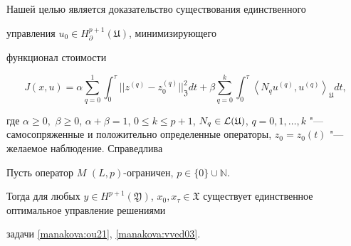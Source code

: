 \smallskip



Нашей целью является доказательство существования единственного %

управления  $u_0 \in{H}^{p+1}_\partial (\mathfrak U)$, минимизирующего

функционал стоимости

\begin{equation}\label{manakova:ou23}

J(x, u) = \alpha\sum^{1}_{q=0} \int^{\tau}_{0}||z^{(q)} - z_0^{(q)}||^2_\mathfrak Z dt +

\beta\sum^{k}_{q=0} \int^{\tau}_{0}\left\langle N_q u^{(q)},

u^{(q)}\right\rangle_\mathfrak U dt,

\end{equation}

где $\alpha\geq 0,$ $\beta\geq0$, $\alpha+\beta=1$, $0\leq k \leq p+1$, $N_q\in {\cal L} (\mathfrak U)$, $q=0, 1, \ldots, k$ "--- самосопряженные и положительно определенные операторы, $z_0=z_0 (t)$ "--- желаемое наблюдение. Справедлива



\begin{theorem}

Пусть оператор $M$ $(L, p)$-ограничен, $p\in\{0\}\cup \mathbb N${\rm .}

Тогда для любых $y \in {H}^{p+1}(\mathfrak Y)${\rm ,} $x_0, x_{\tau}\in\mathfrak X$  существует единственное оптимальное управление решениями

задачи \eqref{manakova:ou21}, \eqref{manakova:vved03}.

\end{theorem}



\smallskip



